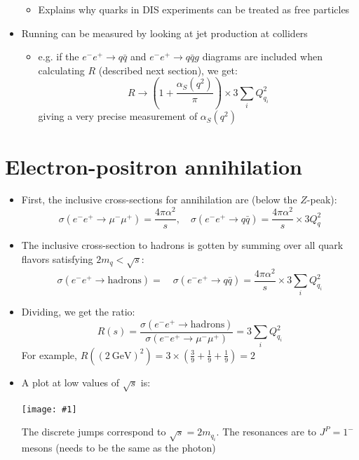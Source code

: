 \documentclass[11pt]{article}
\newcommand{\qbar}{{\bar{q}}}
\newcommand{\gev}{\text{GeV}}
\newcommand{\el}{\ensuremath{e^{-}}\xspace}
\newcommand{\pos}{\ensuremath{e^{+}}\xspace}
\newcommand{\embedimgw}[2]{\begin{center}\texttt{[image: \#1]}\end{center}}
\begin{document}
\begin{itemize}
  \begin{itemize}
    \item Explains why quarks in DIS experiments can be treated as free particles
  \end{itemize}
  \item Running can be measured by looking at jet production at colliders
  \begin{itemize}
    \item e.g. if the $\el\pos\rightarrow q\qbar$ and $\el\pos\rightarrow q\qbar g$ diagrams are included when calculating $R$ (described next section), we get:
    \begin{equation}
      R \rightarrow  \left(1+\frac{\alpha_S(q^2)}{\pi}\right) \times 3\sum_i Q_{q_i}^2
    \end{equation}
    giving a very precise measurement of $\alpha_S(q^2)$
  \end{itemize}
\end{itemize}

\section{Electron-positron annihilation}

\begin{itemize}
  \item First, the inclusive cross-sections for annihilation are (below the $Z$-peak):
  \begin{equation}
    \sigma(\el\pos\rightarrow\mu^-\mu^+) = \frac{4\pi\alpha^2}{s},\quad\sigma(\el\pos\rightarrow q\qbar) = \frac{4\pi\alpha^2}{s}\times 3Q_q^2
  \end{equation}
  \item The inclusive cross-section to hadrons is gotten by summing over all quark flavors satisfying $2m_q < \sqrt{s}$:
  \begin{equation}
    \sigma(\el\pos\rightarrow\text{hadrons}) = \quad\sigma(\el\pos\rightarrow q\qbar) = \frac{4\pi\alpha^2}{s}\times 3\sum_i Q_{q_i}^2
  \end{equation}
  \item Dividing, we get the ratio:
  \begin{equation}
    R(s) = \frac{\sigma(\el\pos\rightarrow \text{hadrons})}{\sigma(\el\pos\rightarrow \mu^-\mu^+)} = 3\sum_i Q_{q_i}^2
  \end{equation}
  For example, $R((2~\gev)^2) = 3\times \left(\frac{3}{9}+\frac{1}{9}+\frac{1}{9}\right) = 2 $
  \item A plot at low values of $\sqrt s$ is:
  \embedimgw{figs/r_thomson.png}{.7}
  The discrete jumps correspond to $\sqrt s = 2m_{q_i}$. The resonances are to $J^P = 1^-$ mesons (needs to be the same as the photon)
\end{itemize}
\end{document}
